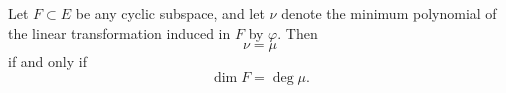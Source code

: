 Let $F \subset E$ be any cyclic subspace, and let $\nu$ denote the minimum polynomial of the linear transformation induced in $F$ by $\varphi$. Then
$$\nu = \mu$$
if and only if
$$\dim F = \deg \mu.$$
